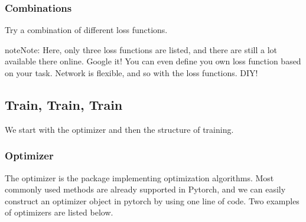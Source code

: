 \documentclass[letterpaper,10pt,english]{sphinxmanual}
\begin{document}
\subsubsection{Combinations}
\label{\detokenize{usage/train:combinations}}
Try a combination of different loss functions.

%
\begin{sphinxVerbatim}[commandchars=\\\{\}]
    
      
\end{sphinxVerbatim}

\begin{sphinxadmonition}{note}{Note:}
Here, only three loss functions are listed, and there are still a lot available there online. Google it! You can even define you own loss function based on your task. Network is flexible, and so with the loss functions. DIY!
\end{sphinxadmonition}


\subsection{Train, Train, Train}
\label{\detokenize{usage/train:train-train-train}}
We start with the optimizer and then the structure of training.


\subsubsection{Optimizer}
\label{\detokenize{usage/train:optimizer}}
The optimizer is the package implementing optimization algorithms. Most commonly used methods are already supported in Pytorch, and we can easily construct an optimizer object in pytorch by using one line of code. Two examples of optimizers are listed below.

%
\begin{sphinxVerbatim}[commandchars=\\\{\}]
    
  \PYG{p}{[} \PYG{p}{]} 
\end{sphinxVerbatim}
\end{document}
